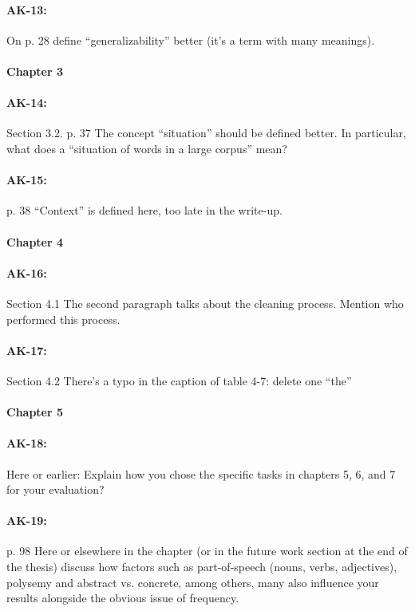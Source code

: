 \documentclass[11pt,a4paper]{article}
\begin{document}
\paragraph{AK-13:} On p. 28 define “generalizability” better (it’s a term with many meanings).

\paragraph{Chapter 3}

\paragraph{AK-14:} Section 3.2. p. 37 The concept “situation” should be defined better. In particular, what does a “situation of words in a large corpus” mean?

\paragraph{AK-15:} p. 38 “Context” is defined here, too late in the write-up.

\paragraph{Chapter 4}

\paragraph{AK-16:} Section 4.1 The second paragraph talks about the cleaning process. Mention who performed this process.

\paragraph{AK-17:} Section 4.2 There’s a typo in the caption of table 4-7: delete one “the”

\paragraph{Chapter 5}

\paragraph{AK-18:} Here or earlier: Explain how you chose the specific tasks in chapters 5, 6, and 7 for your evaluation?

\paragraph{AK-19:} p. 98 Here or elsewhere in the chapter (or in the future work section at the end of the thesis) discuss how factors such as part-of-speech (nouns, verbs, adjectives), polysemy and abstract vs. concrete, among others, many also influence your results alongside the obvious issue of frequency.
\end{document}
